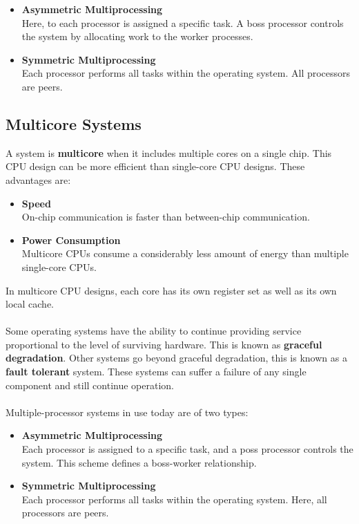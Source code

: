 \documentclass{article}
\begin{document}
\begin{itemize}
	\item \textbf{Asymmetric Multiprocessing}
	\vspace{.2cm} \\
	Here, to each processor is assigned a specific task. A boss processor controls the system by allocating work to the worker processes.
	
	\item \textbf{Symmetric Multiprocessing}
	\vspace{.2cm} \\
	Each processor performs all tasks within the operating system. All processors are peers.
\end{itemize}

\subsection{Multicore Systems}
A system is \textbf{multicore} when it includes multiple cores on a single chip. This CPU design can be more efficient than single-core CPU designs. These advantages are:

\begin{itemize}
	\item \textbf{Speed}
	\vspace{.2cm} \\
	On-chip communication is faster than between-chip communication.
	
	\item \textbf{Power Consumption}
	\vspace{.2cm} \\
	Multicore CPUs consume a considerably less amount of energy than multiple single-core CPUs.
\end{itemize}
In multicore CPU designs, each core has its own register set as well as its own local cache. \\ \\
Some operating systems have the ability to continue providing service proportional to the level of surviving hardware. This is known as \textbf{graceful degradation}. Other systems go beyond graceful degradation, this is known as a \textbf{fault tolerant} system. These systems can suffer a failure of any single component and still continue operation. \\ \\
Multiple-processor systems in use today are of two types:

\begin{itemize}
	\item \textbf{Asymmetric Multiprocessing}
	\vspace{.2cm} \\
	Each processor is assigned to a specific task, and a poss processor controls the system. This scheme defines a boss-worker relationship.
	
	\item \textbf{Symmetric Multiprocessing}
	\vspace{.2cm} \\
	Each processor performs all tasks within the operating system. Here, all processors are peers.
\end{itemize}
\end{document}
